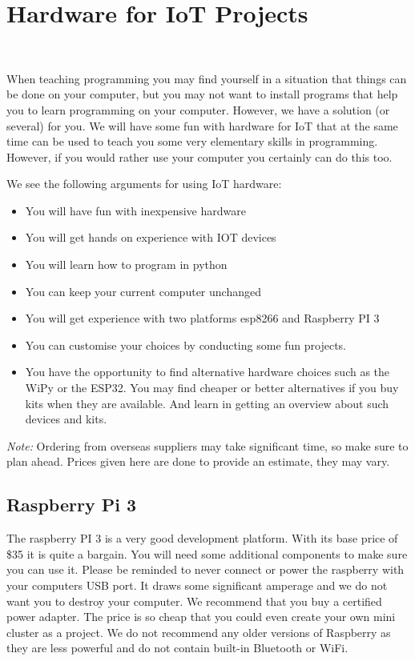 

\chapter{Hardware for IoT Projects}\label{hardware-for-iot-projects}

\FILENAME\

When teaching programming you may find yourself in a situation that
things can be done on your computer, but you may not want to install
programs that help you to learn programming on your computer. However,
we have a solution (or several) for you. We will have some fun with
hardware for IoT that at the same time can be used to teach you some
very elementary skills in programming. However, if you would rather use
your computer you certainly can do this too.

We see the following arguments for using IoT hardware:

\begin{itemize}

\item
  You will have fun with inexpensive hardware
\item
  You will get hands on experience with IOT devices
\item
  You will learn how to program in python
\item
  You can keep your current computer unchanged
\item
  You will get experience with two platforms esp8266 and Raspberry PI 3
\item
  You can customise your choices by conducting some fun projects.
\item
  You have the opportunity to find alternative hardware choices such as
  the WiPy or the ESP32. You may find cheaper or better alternatives if
  you buy kits when they are available. And learn in getting an overview
  about such devices and kits.
\end{itemize}

\emph{Note:} Ordering from overseas suppliers may take significant time,
so make sure to plan ahead. Prices given here are done to provide an
estimate, they may vary.

\section{Raspberry Pi 3}\label{raspberry-pi-3}

The raspberry PI 3 is a very good development platform. With its base
price of \$35 it is quite a bargain. You will need some additional
components to make sure you can use it. Please be reminded to never
connect or power the raspberry with your computers USB port. It draws
some significant amperage and we do not want you to destroy your
computer. We recommend that you buy a certified power adapter. The price
is so cheap that you could even create your own mini cluster as a
project. We do not recommend any older versions of Raspberry as they are
less powerful and do not contain built-in Bluetooth or WiFi.

